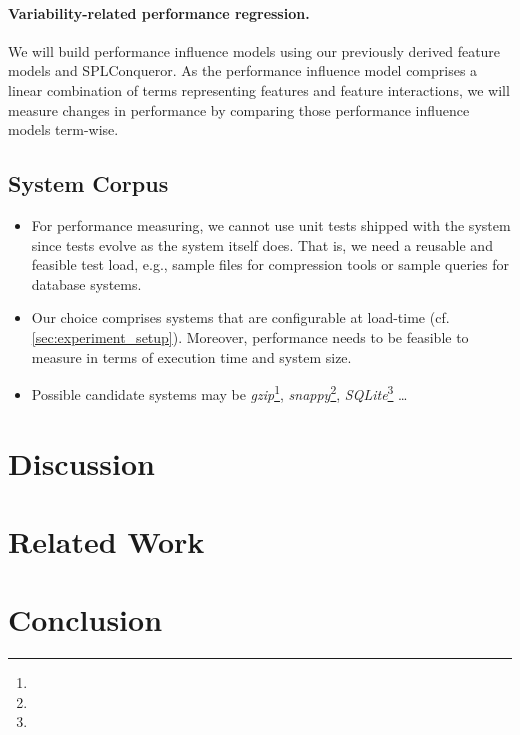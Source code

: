 \documentclass[a4paper,10pt]{scrartcl}
\begin{document}
				  \paragraph{Variability-related performance regression.}{We will
				  build performance influence models using our previously derived feature
				  models and SPLConqueror. As the performance influence model comprises a
				  linear combination of terms representing features and feature
				  interactions, we will measure changes in performance by comparing those
				  performance influence models term-wise.}
				
\subsection{System Corpus}
				\begin{itemize}
				  \item For performance measuring, we cannot use unit tests shipped with the
				  system since tests evolve as the system itself does. That is, we need a
				  reusable and feasible test load, e.g., sample files for compression tools
				  or sample queries for database systems.

				  \item Our choice comprises systems that are configurable at load-time
				  (cf. \ref{sec:experiment_setup}). Moreover, performance needs to be
				  feasible to measure in terms of execution time and system size.

				  \item Possible candidate systems may be \emph{gzip}\footnote{},
				  \emph{snappy}\footnote{}, \emph{SQLite}\footnote{} \ldots
				\end{itemize}
			
\section{Discussion}
\section{Related Work}
\section{Conclusion}


{}
\end{document}
